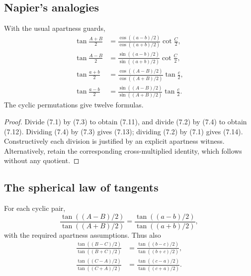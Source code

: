 \subsection{Napier's analogies}

\begin{theorem}
\label{thm:napier}
With the usual apartness guards,
\begin{align}
 \tan\frac{A+B}{2}
 &=\frac{\cos((a-b)/2)}{\cos((a+b)/2)}\cot\frac C2,         \tag{7.11}\\
 \tan\frac{A-B}{2}
 &=\frac{\sin((a-b)/2)}{\sin((a+b)/2)}\cot\frac C2,         \tag{7.12}\\
 \tan\frac{a+b}{2}
 &=\frac{\cos((A-B)/2)}{\cos((A+B)/2)}\tan\frac c2,        \tag{7.13}\\
 \tan\frac{a-b}{2}
 &=\frac{\sin((A-B)/2)}{\sin((A+B)/2)}\tan\frac c2.        \tag{7.14}
\end{align}
The cyclic permutations give twelve formulas.
\end{theorem}

\begin{proof}
Divide (7.1) by (7.3) to obtain (7.11), and divide (7.2) by (7.4) to obtain
(7.12).  Dividing (7.4) by (7.3) gives (7.13); dividing (7.2) by (7.1) gives
(7.14).  Constructively each division is justified by an explicit apartness
witness.  Alternatively, retain the corresponding cross-multiplied identity,
which follows without any quotient.
\end{proof}

\subsection{The spherical law of tangents}

\begin{corollary}
\label{cor:tangent-law}
For each cyclic pair,
\begin{equation}
 \frac{\tan((A-B)/2)}{\tan((A+B)/2)}
 =\frac{\tan((a-b)/2)}{\tan((a+b)/2)},                     \tag{7.15}
\end{equation}
with the required apartness assumptions.  Thus also
\begin{align}
 \frac{\tan((B-C)/2)}{\tan((B+C)/2)}
 &=\frac{\tan((b-c)/2)}{\tan((b+c)/2)},                    \tag{7.16}\\
 \frac{\tan((C-A)/2)}{\tan((C+A)/2)}
 &=\frac{\tan((c-a)/2)}{\tan((c+a)/2)}.                    \tag{7.17}
\end{align}
\end{corollary}

